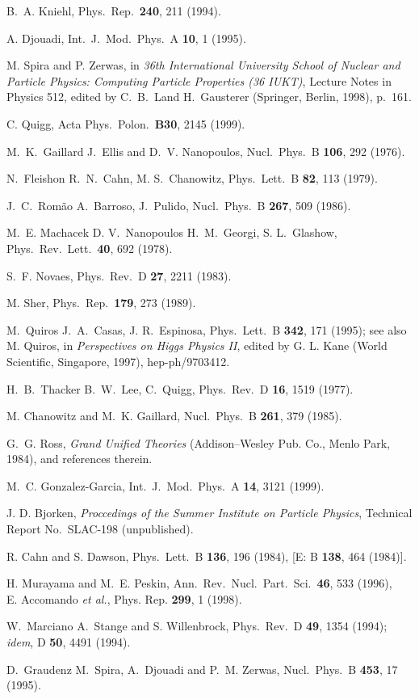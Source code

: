 \documentclass[12pt]{report}
\begin{document}
\begin{thebibliography}{100}
B.~A. Kniehl, Phys.\ Rep.\ {\bf 240},  211  (1994).

A. Djouadi, Int.\ J.\ Mod.\ Phys.\ A {\bf 10},  1  (1995).

M. Spira and P. Zerwas,  in {\em 36th International University School of
  Nuclear and Particle Physics: Computing Particle Properties (36 IUKT)},
  Lecture Notes in Physics 512, edited by C.~B.~Land H.~Gausterer (Springer,
  Berlin, 1998), p.\ 161.

C. Quigg, Acta Phys.\ Polon.\ {\bf B30},  2145  (1999).

M.~K.~Gaillard J.~Ellis and D.~V. Nanopoulos, Nucl.\ Phys.\ B {\bf 106},  292
  (1976).

N.~Fleishon R.~N.~Cahn, M. S.~Chanowitz, Phys.\ Lett.\ B {\bf 82},  113
  (1979).

J.~C.~Rom\~ao A.~Barroso, J.~Pulido, Nucl.\ Phys.\ B {\bf 267},  509  (1986).

M.~E. Machacek D. V.~Nanopoulos H.~M.~Georgi, S. L.~Glashow, Phys.\ Rev.\
  Lett.\ {\bf 40},  692  (1978).

S.~F. Novaes, Phys.\ Rev.\ D {\bf 27},  2211  (1983).

M. Sher, Phys.\ Rep.\ {\bf 179},  273  (1989).

M.~Quiros J.~A.~Casas, J. R.~Espinosa, Phys.\ Lett.\ B {\bf 342},  171
 (1995); see also M. Quiros, in {\it Perspectives on Higgs Physics II}, 
 edited by G. L. Kane (World Scientific, Singapore, 1997), hep-ph/9703412.

H.~B.~Thacker B.~W.~Lee, C.~Quigg, Phys.\ Rev.\ D {\bf 16},  1519  (1977).

M. Chanowitz and M.~K. Gaillard, Nucl.\ Phys.\ B {\bf 261},  379  (1985).

G.~G. Ross, {\em Grand Unified Theories} (Addison--Wesley Pub. Co., Menlo Park,
  1984), and references therein.

M.~C. Gonzalez-Garcia, Int.\ J.\ Mod.\ Phys.\ A {\bf 14},  3121  (1999).

{J. D. Bjorken, {\it Proccedings of the Summer Institute on Particle Physics}},
  Technical Report No.~SLAC-198 (unpublished).

R. Cahn and S. Dawson, Phys.\ Lett.\ B {\bf 136},  196  (1984), [{E}: B {\bf
  138}, 464 (1984)].

H. Murayama and M.~E. Peskin, Ann.\ Rev.\ Nucl.\ Part.\ Sci.\ {\bf 46},  533
  (1996), ~ {E.} Accomando {{\it et al.}}, Phys. Rep. {\bf 299}, 1 (1998).

W.~Marciano A.~Stange and S. Willenbrock, Phys.\ Rev.\ D {\bf 49},  1354
  (1994); {\it idem}, D {\bf 50}, 4491 (1994).

D.~Graudenz M.~Spira, A.~Djouadi and P.~M. Zerwas, Nucl.\ Phys.\ B {\bf 453},
  17  (1995).

\end{thebibliography}

\end{document}
